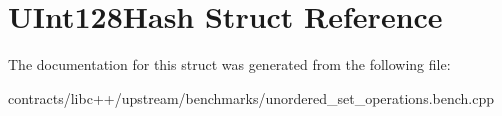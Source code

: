 \hypertarget{struct_u_int128_hash}{}\section{U\+Int128\+Hash Struct Reference}
\label{struct_u_int128_hash}


The documentation for this struct was generated from the following file\+:\begin{DoxyCompactItemize}
\item 
contracts/libc++/upstream/benchmarks/unordered\+\_\+set\+\_\+operations.\+bench.\+cpp\end{DoxyCompactItemize}
